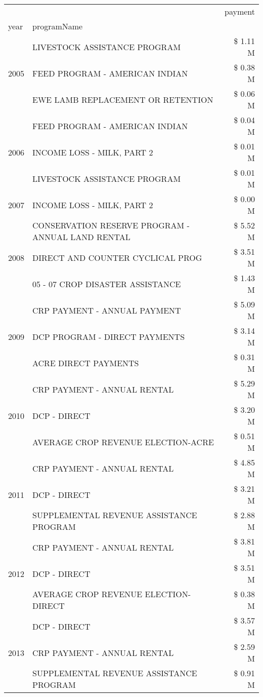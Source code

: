 \begin{tabular}{llr}
\toprule
 &  & payment \\
year & programName &  \\
\midrule
\multirow[t]{3}{*}{2005} & LIVESTOCK ASSISTANCE PROGRAM & \$ 1.11 M \\
 & FEED PROGRAM - AMERICAN INDIAN & \$ 0.38 M \\
 & EWE LAMB REPLACEMENT OR RETENTION & \$ 0.06 M \\
\cline{1-3}
\multirow[t]{3}{*}{2006} & FEED PROGRAM - AMERICAN INDIAN & \$ 0.04 M \\
 & INCOME LOSS - MILK, PART 2 & \$ 0.01 M \\
 & LIVESTOCK ASSISTANCE PROGRAM & \$ 0.01 M \\
\cline{1-3}
2007 & INCOME LOSS - MILK, PART 2 & \$ 0.00 M \\
\cline{1-3}
\multirow[t]{3}{*}{2008} & CONSERVATION RESERVE PROGRAM - ANNUAL LAND RENTAL & \$ 5.52 M \\
 & DIRECT AND COUNTER CYCLICAL PROG & \$ 3.51 M \\
 & 05 - 07 CROP DISASTER ASSISTANCE & \$ 1.43 M \\
\cline{1-3}
\multirow[t]{3}{*}{2009} & CRP PAYMENT - ANNUAL PAYMENT & \$ 5.09 M \\
 & DCP PROGRAM - DIRECT PAYMENTS & \$ 3.14 M \\
 & ACRE DIRECT PAYMENTS & \$ 0.31 M \\
\cline{1-3}
\multirow[t]{3}{*}{2010} & CRP PAYMENT - ANNUAL RENTAL & \$ 5.29 M \\
 & DCP - DIRECT & \$ 3.20 M \\
 & AVERAGE CROP REVENUE ELECTION-ACRE & \$ 0.51 M \\
\cline{1-3}
\multirow[t]{3}{*}{2011} & CRP PAYMENT - ANNUAL RENTAL & \$ 4.85 M \\
 & DCP - DIRECT & \$ 3.21 M \\
 & SUPPLEMENTAL REVENUE ASSISTANCE PROGRAM & \$ 2.88 M \\
\cline{1-3}
\multirow[t]{3}{*}{2012} & CRP PAYMENT - ANNUAL RENTAL & \$ 3.81 M \\
 & DCP - DIRECT & \$ 3.51 M \\
 & AVERAGE CROP REVENUE ELECTION-DIRECT & \$ 0.38 M \\
\cline{1-3}
\multirow[t]{3}{*}{2013} & DCP - DIRECT & \$ 3.57 M \\
 & CRP PAYMENT - ANNUAL RENTAL & \$ 2.59 M \\
 & SUPPLEMENTAL REVENUE ASSISTANCE PROGRAM & \$ 0.91 M \\

\end{tabular}
